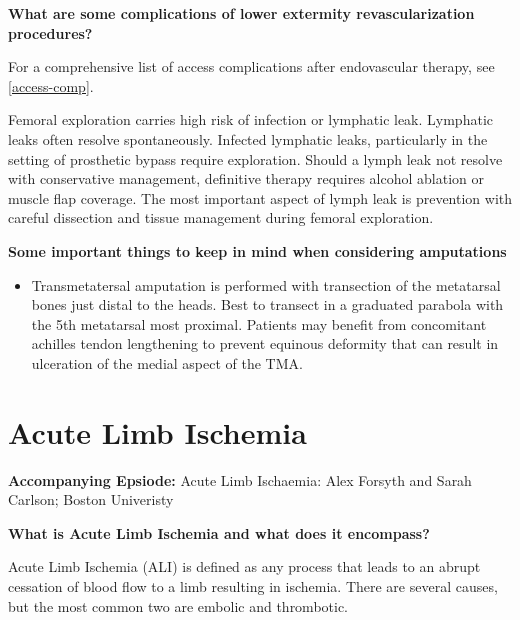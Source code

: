 \documentclass[
]{book}
\providecommand{\tightlist}{%
  \setlength{\itemsep}{0pt}\setlength{\parskip}{0pt}}
\begin{document}
\textbf{What are some complications of lower extermity revascularization
procedures?}

For a comprehensive list of access complications after endovascular
therapy, see \ref{access-comp}.

Femoral exploration carries high risk of infection or lymphatic leak.
Lymphatic leaks often resolve spontaneously. Infected lymphatic leaks,
particularly in the setting of prosthetic bypass require exploration.
Should a lymph leak not resolve with conservative management, definitive
therapy requires alcohol ablation or muscle flap coverage. The most important
aspect of lymph leak is prevention with careful dissection and tissue
management during femoral exploration.\citep{obara2014, weaver2014}

\textbf{Some important things to keep in mind when considering amputations}

\begin{itemize}
\tightlist
\item
  Transmetatersal amputation is performed with transection of the
  metatarsal bones just distal to the heads. Best to transect in a
  graduated parabola with the 5th metatarsal most proximal. Patients
  may benefit from concomitant achilles tendon lengthening to prevent
  equinous deformity that can result in ulceration of the medial
  aspect of the TMA.\citep{eidt2019}
\end{itemize}

\hypertarget{acute-limb-ischemia-1}{%
\section{Acute Limb Ischemia}\label{acute-limb-ischemia-1}}

\textbf{Accompanying Epsiode:}
Acute Limb Ischaemia: Alex Forsyth and Sarah Carlson; Boston Univeristy

\textbf{What is Acute Limb Ischemia and what does it encompass?}

Acute Limb Ischemia (ALI) is defined as any process that leads to an abrupt
cessation of blood flow to a limb resulting in ischemia. There are several
causes, but the most common two are embolic and thrombotic.
\end{document}
